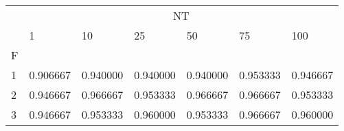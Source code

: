 \begin{table}[htbp]
\centering
\label{iris-results}
\begin{tabular}{lllllll}
\toprule
 & \multicolumn{6}{c}{NT} \\
 & 1 & 10 & 25 & 50 & 75 & 100 \\
F &  &  &  &  &  &  \\
\midrule
1 & 0.906667 & 0.940000 & 0.940000 & 0.940000 & 0.953333 & 0.946667 \\
2 & 0.946667 & 0.966667 & 0.953333 & 0.966667 & 0.966667 & 0.953333 \\
3 & 0.946667 & 0.953333 & 0.960000 & 0.953333 & 0.966667 & 0.960000 \\
\bottomrule
\end{tabular}
\end{table}
